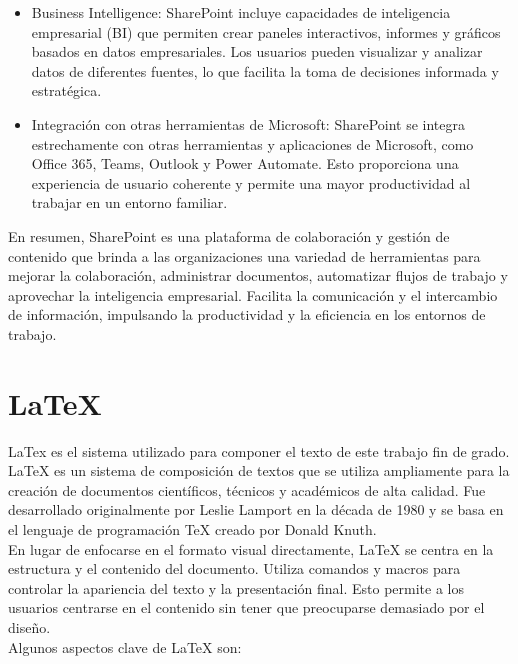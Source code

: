 \documentclass[a4paper, 12pt]{book}
\begin{document}
\begin{itemize}
\item Business Intelligence: SharePoint incluye capacidades de inteligencia empresarial (BI) que permiten crear paneles interactivos, informes y gráficos basados en datos empresariales. Los usuarios pueden visualizar y analizar datos de diferentes fuentes, lo que facilita la toma de decisiones informada y estratégica.

\item Integración con otras herramientas de Microsoft: SharePoint se integra estrechamente con otras herramientas y aplicaciones de Microsoft, como Office 365, Teams, Outlook y Power Automate. Esto proporciona una experiencia de usuario coherente y permite una mayor productividad al trabajar en un entorno familiar.
\end{itemize}

En resumen, SharePoint es una plataforma de colaboración y gestión de contenido que brinda a las organizaciones una variedad de herramientas para mejorar la colaboración, administrar documentos, automatizar flujos de trabajo y aprovechar la inteligencia empresarial. Facilita la comunicación y el intercambio de información, impulsando la productividad y la eficiencia en los entornos de trabajo.


\section{LaTeX} 
\label{sec:LaTeX}

LaTex es el sistema utilizado para componer el texto de este trabajo fin de grado.
\\

LaTeX es un sistema de composición de textos que se utiliza ampliamente para la creación de documentos científicos, técnicos y académicos de alta calidad. Fue desarrollado originalmente por Leslie Lamport en la década de 1980 y se basa en el lenguaje de programación TeX creado por Donald Knuth.
\\

En lugar de enfocarse en el formato visual directamente, LaTeX se centra en la estructura y el contenido del documento. Utiliza comandos y macros para controlar la apariencia del texto y la presentación final. Esto permite a los usuarios centrarse en el contenido sin tener que preocuparse demasiado por el diseño.
\\

Algunos aspectos clave de LaTeX son:
\end{document}
